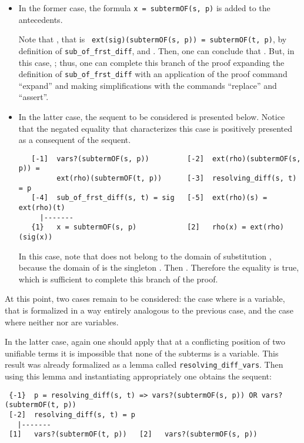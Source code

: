 \documentclass[submission,copyright,creativecommons]{eptcs}
\begin{document}
\begin{itemize}
\item In the former case, the formula {\tt x = subtermOF(s, p)} is
  added to the antecedents.

  Note that , that is {\tt
    ext(sig)(subtermOF(s, p)) = subtermOF(t, p)}, by definition of
  {\tt sub\_of\_frst\_diff}, and . Then, one can conclude that . But, in this case, ;
  thus, one can complete this branch of the proof expanding the
  definition of {\tt sub\_of\_frst\_diff} with an application of the
  proof command ``expand'' and making simplifications with the
  commands ``replace'' and ``assert''.

\item In the latter case, the sequent to be considered is presented
  below.  Notice that the negated equality that characterizes this
  case is positively presented as a consequent of the sequent.
             
  {\small
\begin{verbatim}
   [-1]  vars?(subtermOF(s, p))         [-2]  ext(rho)(subtermOF(s, p)) = 
         ext(rho)(subtermOF(t, p))      [-3]  resolving_diff(s, t) = p
   [-4]  sub_of_frst_diff(s, t) = sig   [-5]  ext(rho)(s) = ext(rho)(t)
     |-------
   {1}   x = subtermOF(s, p)            [2]   rho(x) = ext(rho)(sig(x))
\end{verbatim}
  }

  In this case, note that  does not belong to the domain of
  substitution , because the domain of  is the
  singleton . Then . Therefore the equality
   is true, which is sufficient to
  complete this branch of the proof.
\end{itemize}

At this point, two cases remain to be considered: the case where
 is a variable, that is formalized in a way entirely analogous
to the previous case, and the case where neither  nor  are
variables.

In the latter case, again one should apply that at a conflicting
position of two unifiable terms it is impossible that none of the
subterms is a variable. This result was already formalized as a lemma
called {\tt resolving\_diff\_vars}. Then using this lemma and
instantiating appropriately one obtains the sequent:

{\small
\begin{verbatim}
 {-1}  p = resolving_diff(s, t) => vars?(subtermOF(s, p)) OR vars?(subtermOF(t, p))
 [-2]  resolving_diff(s, t) = p
   |-------
 [1]   vars?(subtermOF(t, p))   [2]   vars?(subtermOF(s, p))
\end{verbatim}
}
\end{document}

